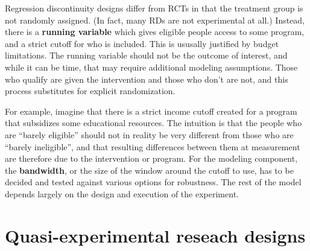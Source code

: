 Regression discontinuity designs differ from RCTs
in that the treatment group is not randomly assigned.
(In fact, many RDs are not experimental at all.)
Instead, there is a \textbf{running variable}
which gives eligible people access to some program,
and a strict cutoff for who is included.
This is ususally justified by budget limitations.
The running variable should not be the outcome of interest,
and while it can be time, that may require additional modeling assumptions.
Those who qualify are given the intervention and those who don't are not,
and this process substitutes for explicit randomization.

For example, imagine that there is a strict income cutoff created
for a program that subsidizes some educational resources.
The intuition is that the people who are ``barely eligible''
should not in reality be very different from those who are ``barely ineligible'',
and that resulting differences between them at measurement
are therefore due to the intervention or program.
For the modeling component, the \textbf{bandwidth},
or the size of the window around the cutoff to use,
has to be decided and tested against various options for robustness.
The rest of the model depends largely on the design and execution of the experiment.


\section{Quasi-experimental reseach designs}
